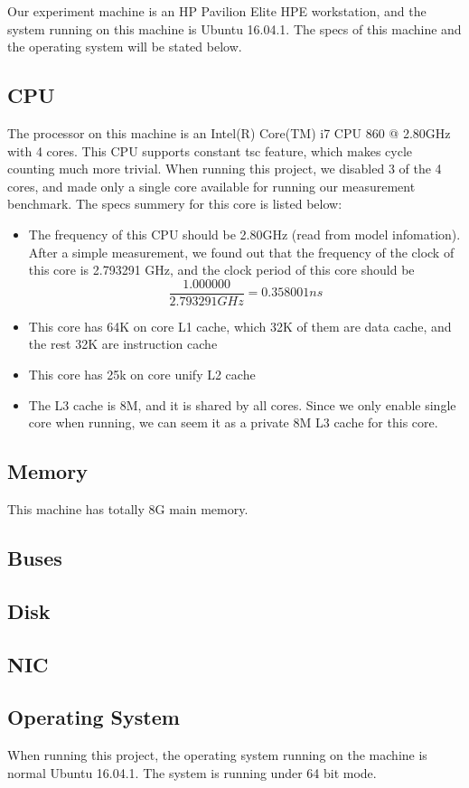 Our experiment machine is an HP Pavilion Elite HPE workstation, and the system running on this machine is Ubuntu 16.04.1. The specs of this machine and the operating system will be stated below.

\subsection{CPU}

The processor on this machine is an Intel(R) Core(TM) i7 CPU 860 @ 2.80GHz with 4 cores. This CPU supports constant tsc feature, which makes cycle counting much more trivial. When running this project, we disabled 3 of the 4 cores, and made only a single core available for running our measurement benchmark. The specs summery for this core is listed below:

\begin{itemize}
    \item The frequency of this CPU should be 2.80GHz (read from model infomation). After a simple measurement, we found out that the frequency of the clock of this core is 2.793291 GHz, and the clock period of this core should be $$ \frac{1.000000}{2.793291 GHz} = 0.358001 ns $$
    \item This core has 64K on core L1 cache, which 32K of them are data cache, and the rest 32K are instruction cache
    \item This core has 25k on core unify L2 cache
    \item The L3 cache is 8M, and it is shared by all cores. Since we only enable single core when running, we can seem it as a private 8M L3 cache for this core.
\end{itemize}

\subsection{Memory}

This machine has totally 8G main memory.

\subsection{Buses}

\subsection{Disk}

\subsection{NIC}

\subsection{Operating System}
When running this project, the operating system running on the machine is normal Ubuntu 16.04.1. The system is running under 64 bit mode.
